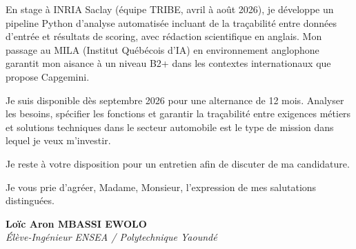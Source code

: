 \documentclass[a4paper,11pt]{article}
\begin{document}
En stage à INRIA Saclay (équipe TRIBE, avril à août 2026), je développe un pipeline Python d'analyse automatisée incluant de la traçabilité entre données d'entrée et résultats de scoring, avec rédaction scientifique en anglais. Mon passage au MILA (Institut Québécois d'IA) en environnement anglophone garantit mon aisance à un niveau B2+ dans les contextes internationaux que propose Capgemini.

Je suis disponible dès septembre 2026 pour une alternance de 12 mois. Analyser les besoins, spécifier les fonctions et garantir la traçabilité entre exigences métiers et solutions techniques dans le secteur automobile est le type de mission dans lequel je veux m'investir.

Je reste à votre disposition pour un entretien afin de discuter de ma candidature.

Je vous prie d'agréer, Madame, Monsieur, l'expression de mes salutations distinguées.

\vspace{0.8cm}

\textbf{Loïc Aron MBASSI EWOLO}\\
\textit{Élève-Ingénieur ENSEA / Polytechnique Yaoundé}
\end{document}
